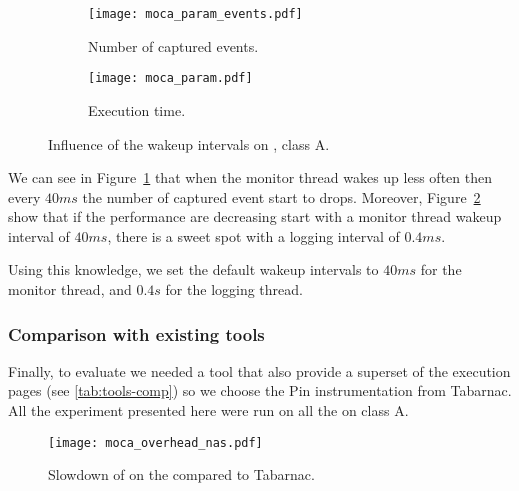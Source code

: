 \begin{figure}[htb]
    \centering
    \begin{subfigure}{\linewidth}
        \texttt{[image: moca\_param\_events.pdf]}
        \caption{Number of captured events.}
        \label{fig:param_evts}
    \end{subfigure}
    \begin{subfigure}{\linewidth}
        \texttt{[image: moca\_param.pdf]}
        \caption{Execution time.}
        \label{fig:param_time}
    \end{subfigure}
    \caption{Influence of the wakeup intervals on \IS, class A.}
    \label{fig:param}
\end{figure}

We can see in Figure~\ref{fig:param_evts} that when the monitor thread wakes
up less often then every $40ms$ the number of captured event start to drops.
Moreover, Figure~\ref{fig:param_time} show that if the performance are decreasing
start with a monitor thread wakeup interval of $40ms$, there is a sweet spot
with a logging interval of $0.4ms$.

Using this knowledge, we set the default wakeup intervals to $40ms$ for the
monitor thread, and $0.4s$ for the logging thread.

\subsubsection{Comparison with existing tools}

Finally, to evaluate \Moca we needed a tool that also provide a superset of
the execution pages (see \ref{tab:tools-comp}) so we choose the Pin
instrumentation from Tabarnac. All the experiment presented here were run on
all the \NPB on class A.

\begin{figure}[htb]
    \centering
    \texttt{[image: moca\_overhead\_nas.pdf]}
    \caption{Slowdown of \Moca on the \NPB compared to
    Tabarnac.}
    \label{fig:ovh}
\end{figure}

